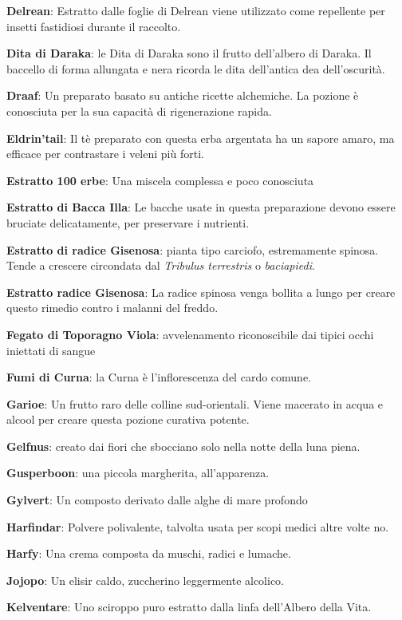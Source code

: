 \begin{multicols}{2}
\textbf{Delrean}: Estratto dalle foglie di Delrean viene utilizzato come repellente per insetti fastidiosi durante il raccolto.

\textbf{Dita di Daraka}: le Dita di Daraka sono il frutto dell'albero di Daraka. Il baccello di forma allungata e nera ricorda le dita dell'antica dea dell'oscurità.

\textbf{Draaf}: Un preparato basato su antiche ricette alchemiche. La pozione è conosciuta per la sua capacità di rigenerazione rapida.

\textbf{Eldrin'tail}: Il tè preparato con questa erba argentata ha un sapore amaro, ma efficace per contrastare i veleni più forti.

\textbf{Estratto 100 erbe}: Una miscela complessa e poco conosciuta

\textbf{Estratto di Bacca Illa}: Le bacche usate in questa preparazione devono essere bruciate delicatamente, per preservare i nutrienti.

\textbf{Estratto di radice Gisenosa}: pianta tipo carciofo, estremamente spinosa. Tende a crescere circondata dal \emph{Tribulus terrestris} o \emph{baciapiedi}.

\textbf{Estratto radice Gisenosa}: La radice spinosa venga bollita a lungo per creare questo rimedio contro i malanni del freddo.

\textbf{Fegato di Toporagno Viola}: avvelenamento riconoscibile dai tipici occhi iniettati di sangue

\textbf{Fumi di Curna}: la Curna è l'inflorescenza del cardo comune.

\textbf{Garioe}: Un frutto raro delle colline sud-orientali. Viene macerato in acqua e alcool per creare questa pozione curativa potente.

\textbf{Gelfnus}: creato dai fiori che sbocciano solo nella notte della luna piena.

\textbf{Gusperboon}: una piccola margherita, all'apparenza.

\textbf{Gylvert}: Un composto derivato dalle alghe di mare profondo

\textbf{Harfindar}: Polvere polivalente, talvolta usata per scopi medici altre volte no.

\textbf{Harfy}: Una crema composta da muschi, radici e lumache.

\textbf{Jojopo}: Un elisir caldo, zuccherino leggermente alcolico.

\textbf{Kelventare}: Uno sciroppo puro estratto dalla linfa dell’Albero della Vita.


\end{multicols}
